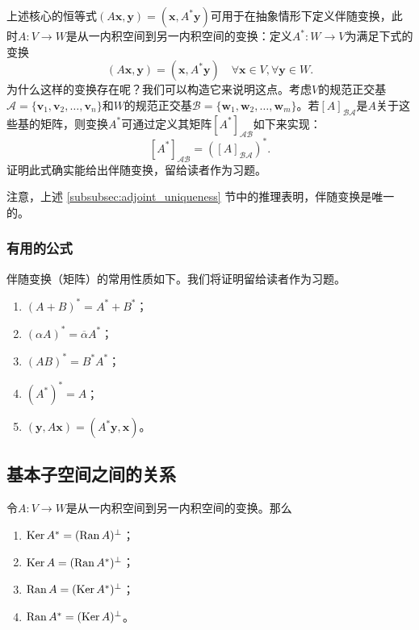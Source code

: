 上述核心的恒等式$(A\mathbf{x},\mathbf{y})=(\mathbf{x},A^*\mathbf{y})$可用于在抽象情形下定义伴随变换，此时$A:V\to W$是从一内积空间到另一内积空间的变换：定义$A^*:W\to V$为满足下式的变换
\[(A\mathbf{x},\mathbf{y})=(\mathbf{x},A^{*}\mathbf{y})\quad\forall\mathbf{x}\in V,\forall\mathbf{y}\in W.\]
为什么这样的变换存在呢？我们可以构造它来说明这点。考虑$V$的规范正交基$\mathcal{A}=\{\mathbf{v}_{1},\mathbf{v}_{2},\ldots,\mathbf{v}_{n}\}$和$W$的规范正交基$\mathcal{B}=\{\mathbf{w}_{1},\mathbf{w}_{2},\ldots,\mathbf{w}_{m}\}$。若$[A]_\mathcal{BA}$是$A$关于这些基的矩阵，则变换$A^*$可通过定义其矩阵$[A^*]_\mathcal{AB}$如下来实现：
\[\left[A^*\right]_{\mathcal{AB}}=(\left[A\right]_{\mathcal{BA}})^*.\]
证明此式确实能给出伴随变换，留给读者作为习题。

注意，上述 \ref{subsubsec:adjoint_uniqueness} 节中的推理表明，伴随变换是唯一的。

\subsubsection{有用的公式}

伴随变换（矩阵）的常用性质如下。我们将证明留给读者作为习题。
\begin{enumerate}
    \item $(A+B)^{*}=A^{*}+B^{*}$；
    \item $(\alpha A)^{*}=\overline{\alpha}A^{*}$；
    \item $(AB)^{*}=B^{*}A^{*}$；
    \item $(A^{*})^{*}=A$；
    \item $(\mathbf{y},A\mathbf{x})=(A^{*}\mathbf{y},\mathbf{x})$。
\end{enumerate}

\subsection{基本子空间之间的关系}

\begin{theorem}\label{thm:geometric_relation_adjoint_fundamental}
    令$A:V\to W$是从一内积空间到另一内积空间的变换。那么
    \begin{enumerate}
        \item $\operatorname{Ker} A^*=(\operatorname{Ran} A)^\perp$；
        \item $\operatorname{Ker} A=(\operatorname{Ran} A^{*})^{\perp}$；
        \item $\operatorname{Ran} A=(\operatorname{Ker} A^{*})^{\perp}$；
        \item $\operatorname{Ran} A^*=(\operatorname{Ker} A)^\perp$。
    \end{enumerate}
\end{theorem}

